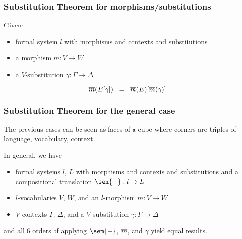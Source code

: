 \begin{frame}\frametitle{Substitution Theorem for morphisms/substitutions}
Given:
\begin{itemize}
\item formal system $l$ with morphisms and contexts and substitutions
\item a morphism $m:V\to W$
\item a $V$-substitution $\gamma:\Gamma\to\Delta$
\end{itemize}

\[\overline{m}(E[\gamma])\;\; = \;\; \overline{m}(E)[\overline{m}(\gamma)]\]

\begin{center}
\end{center}
\end{frame}

\begin{frame}\frametitle{Substitution Theorem for the general case}
The previous cases can be seen as faces of a cube where corners are triples of language, vocabulary, context.

In general, we have
\begin{itemize}
\item formal systems $l$, $L$ with morphisms and contexts and substitutions and a compositional translation $\sem{-}:l\to L$
\item $l$-vocabularies $V$, $W$, and an $l$-morphism $m:V\to W$
\item $V$-contexts $\Gamma$, $\Delta$, and a $V$-substitution $\gamma:\Gamma\to\Delta$
\end{itemize}
and all $6$ orders of applying $\sem{-}$, $\overline{m}$, and $\gamma$ yield equal results.
\end{frame}



